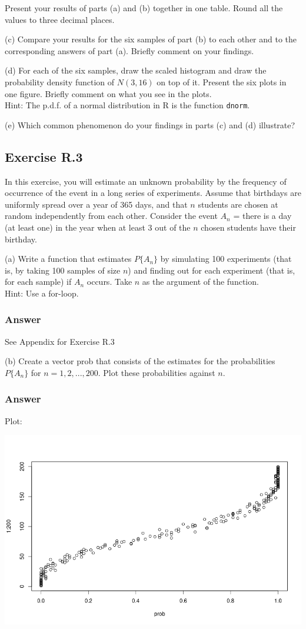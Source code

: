 \documentclass[12pt]{article}
\begin{document}
Present your results of parts (a) and (b) together in one table. Round all the values to three decimal places.

(c) Compare your results for the six samples of part (b) to each other and to the corresponding answers of part (a). Briefly comment on your findings.

(d) For each of the six samples, draw the scaled histogram and draw the probability density function of $N(3, 16)$ on top of it. Present the six plots in one figure. Briefly comment on what you see in the plots.\\
Hint: The p.d.f. of a normal distribution in R is the function \texttt{dnorm}.

(e) Which common phenomenon do your findings in parts (c) and (d) illustrate?

\subsection*{Exercise R.3}
In this exercise, you will estimate an unknown probability by the frequency of occurrence of the event in a long series of experiments. Assume that birthdays are uniformly spread over a year of 365 days, and that $n$ students are chosen at random independently from each other. Consider the event $A_{n}$ = {there is a day (at least one) in the year when at least 3 out of the $n$ chosen students have their birthday}.

(a) Write a function that estimates $P\{A_{n}\}$ by simulating 100 experiments (that is, by taking 100 samples of size $n$) and finding out for each experiment (that is, for each sample) if $A_n$ occurs. Take $n$ as the argument of the function.\\
Hint: Use a for-loop.
\subsubsection*{Answer}
See Appendix for Exercise R.3

(b) Create a vector prob that consists of the estimates for the probabilities $P\{A_{n}\}$ for $n = 1, 2, . . . , 200$. Plot these probabilities against $n$.
\subsubsection*{Answer}
Plot:

\includegraphics[width=\textwidth]{Ex3Plot1}
\end{document}
